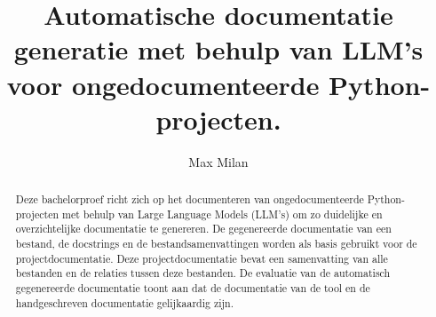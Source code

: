\documentclass[a0,portrait]{hogent-poster}
\title{Automatische documentatie generatie met behulp van LLM's voor ongedocumenteerde Python-projecten.}
\author{Max Milan}
\begin{document}
\maketitle

\begin{abstract}
Deze bachelorproef richt zich op het documenteren van ongedocumenteerde Python-projecten met behulp van Large Language Models (LLM's) om zo duidelijke en overzichtelijke documentatie te genereren.
De gegenereerde documentatie van een bestand, de docstrings en de bestandsamenvattingen worden als basis gebruikt voor de projectdocumentatie.
Deze projectdocumentatie bevat een samenvatting van alle bestanden en de relaties tussen deze bestanden.
De evaluatie van de automatisch gegenereerde documentatie toont aan dat de documentatie van de tool en de handgeschreven documentatie gelijkaardig zijn.
\end{abstract}
\end{document}
